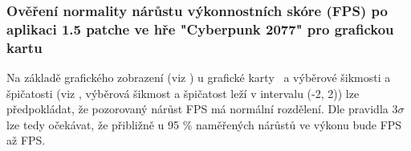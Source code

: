 \subsubsection*{Ověření normality nárůstu výkonnostních skóre (FPS) po aplikaci 1.5 patche ve hře "Cyberpunk 2077" pro grafickou kartu \amdCard}

Na základě grafického zobrazení (viz ) u grafické karty \amdCard\ a výběrové šikmosti a špičatosti (viz ,
výběrová šikmost a špičatost leží v intervalu (-2, 2)) lze předpokládat, že pozorovaný nárůst FPS má normální rozdělení. Dle pravidla 3$\sigma$ lze tedy očekávat,
že přibližně u 95 \% naměřených nárůstů ve výkonu bude  FPS až  FPS\@.

\endinput